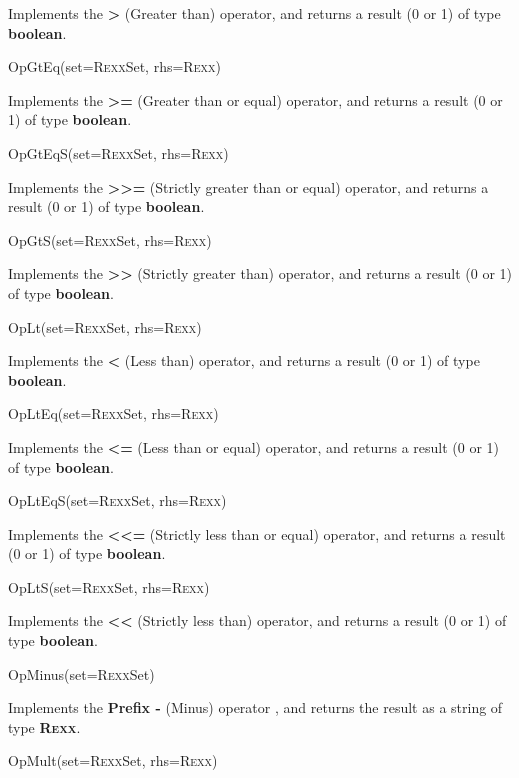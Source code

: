 \begin{description}
Implements the \nr{} \textbf{\textbf{>}} (Greater than)
operator, and returns a result (0 or 1) of type \textbf{boolean}.
\item{OpGtEq(set=R\textsc{exx}Set, rhs=R\textsc{exx})}

Implements the \nr{} \textbf{\textbf{>=}} (Greater than or equal)
operator, and returns a result (0 or 1) of type \textbf{boolean}.
\item{OpGtEqS(set=R\textsc{exx}Set, rhs=R\textsc{exx})}

Implements the \nr{} \textbf{\textbf{>>=}} (Strictly greater than
or equal) operator, and returns a result (0 or 1) of
type \textbf{boolean}.
\item{OpGtS(set=R\textsc{exx}Set, rhs=R\textsc{exx})}

Implements the \nr{} \textbf{\textbf{>>}} (Strictly greater than)
operator, and returns a result (0 or 1) of type \textbf{boolean}.
\item{OpLt(set=R\textsc{exx}Set, rhs=R\textsc{exx})}

Implements the \nr{} \textbf{\textbf{<}} (Less than)
operator, and returns a result (0 or 1) of type \textbf{boolean}.
\item{OpLtEq(set=R\textsc{exx}Set, rhs=R\textsc{exx})}

Implements the \nr{} \textbf{\textbf{<=}} (Less than or equal)
operator, and returns a result (0 or 1) of type \textbf{boolean}.
\item{OpLtEqS(set=R\textsc{exx}Set, rhs=R\textsc{exx})}

Implements the \nr{} \textbf{\textbf{<<=}} (Strictly less than
or equal) operator, and returns a result (0 or 1) of
type \textbf{boolean}.
\item{OpLtS(set=R\textsc{exx}Set, rhs=R\textsc{exx})}

Implements the \nr{} \textbf{\textbf{<<}} (Strictly less than)
operator, and returns a result (0 or 1) of type \textbf{boolean}.
\item{OpMinus(set=R\textsc{exx}Set)}

Implements the \nr{} \textbf{\textbf{Prefix -}} (Minus) operator
, and returns the result as a string of type \textbf{R\textsc{exx}}.
\item{OpMult(set=R\textsc{exx}Set, rhs=R\textsc{exx})}


\end{description}
